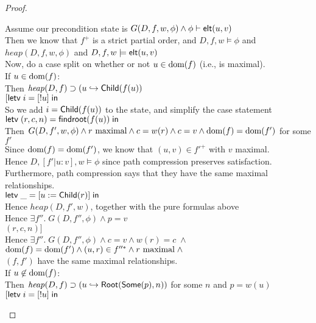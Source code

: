 \begin{proof}
\begin{tabbedproof}
\oo Assume our precondition state is $G(D, f, w, \phi) \land {\phi} \vdash \mathsf{elt}({u}, {v})$ \\
\ooo Then we know that $f^+$ is a strict partial order, and $D,f,w \models \phi$ and \\
\oox $\mathit{heap}(D,f,w,\phi)$ and $D,f,w \models \mathsf{elt}({u}, {v})$ \\
\ooo Now, do a case split on whether or not $u \in \mbox{dom}({f})$ (i.e., is maximal). \\
\ooo If $u \in \mbox{dom}({f})$: \\
\oooo Then $\mathit{heap}(D,f) \supset (u \hookrightarrow \mathsf{Child}(f(u))$ \\
\oooo $[\mathsf{letv}\;i = [!u]\;\mathsf{in}\;$ \\
\oooo So we add $i = \mathsf{Child}(f(u))$ to the state, and simplify the case statement \\
\oooo $\mathsf{letv}\;(r,c,n) = \mathsf{findroot}(f(u))\;\mathsf{in}\;$ \\
\oooo Then $G(D, f', w, \phi) \land r\mbox{ maximal} \land c = w(r) \land c = v  \land \mbox{dom}({f}) = \mbox{dom}({f'})$ for some $f'$ \\
\oooo Since $\mbox{dom}({f}) = \mbox{dom}({f'})$, we know that $(u,v) \in f'^{+}$ with $v$ maximal. \\
\oooo Hence $D,[f'|u:v],w \models \phi$ since path compression preserves satisfaction. \\
\oooo Furthermore, path compression says that they have the same maximal relationships. \\
\oooo $\mathsf{letv}\;\_ = [u := \mathsf{Child}(r)]\;\mathsf{in}\;$ \\
\oooo Hence $\mathit{heap}(D, f', w)$, together with the pure formulas above \\
\oooo Hence $\exists f''.\;G(D, f'', \phi) \land p = v$ \\
\oooo $(r,c,n)]$ \\
\oooo Hence $\exists f''.\;G(D, f'', \phi) \land c = v \land w(r) = c \;\land$ \\
\oooox $\mbox{dom}({f}) = \mbox{dom}({f'}) \land (u,r) \in f''^{*} \land r\mbox{ maximal} \;\land$ \\
\oooox $(f,f')$ have the same maximal relationships. \\
\ooo If $u \not\in \mbox{dom}({f})$:  \\
\oooo Then $\mathit{heap}(D,f) \supset (u \hookrightarrow \mathsf{Root}(\mathsf{Some}(p), n))$ for some $n$ and $p = w(u)$\\
\oooo $[\mathsf{letv}\;i = [!u]\;\mathsf{in}\;$ \\

\end{tabbedproof}
\end{proof}
